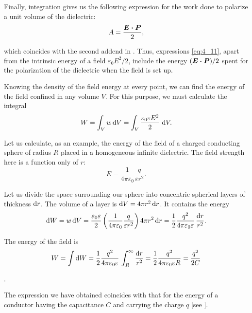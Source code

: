 \noindent
Finally, integration gives us the following expression for the work done to polarize a unit volume of the dielectric:
\begin{equation}\label{eq:4_14}
	A = \frac{\boldsymbol{E\cdot P}}{2},
\end{equation}

\noindent
which coincides with the second addend in . Thus, expressions \eqref{eq:4_11}, apart from the intrinsic energy of a field $\varepsilon_0 E^2/2$, include the energy $(\boldsymbol{E\cdot P})/2$ spent for the polarization of the dielectric when the field is set up.

Knowing the density of the field energy at every point, we can find the energy of the field confined in any volume $V$. For this purpose, we must calculate the integral
\begin{equation}\label{eq:4_15}
	W = \int_V w\, \mathrm{d} V = \int_V \frac{\varepsilon_0 \varepsilon E^2}{2}\ \mathrm{d} V.
\end{equation}

\noindent
Let us calculate, as an example, the energy of the field of a charged conducting sphere of radius $R$ placed in a homogeneous infinite dielectric. The field strength here is a function only of $r$:
\begin{equation*}
	E = \frac{1}{4\pi\varepsilon_0} \frac{q}{\varepsilon r^2}.
\end{equation*}

\noindent
Let us divide the space surrounding our sphere into concentric spherical layers of thickness $\mathrm{d} r$. The volume of a layer is $\mathrm{d} V=4\pi r^2\,\mathrm{d} r$. It contains the energy
\begin{equation*}
	\mathrm{d} W = w\, \mathrm{d} V = \frac{\varepsilon_0 \varepsilon}{2} \left(\frac{1}{4\pi\varepsilon_0} \frac{q}{\varepsilon r^2}\right) 4\pi r^2\,\mathrm{d} r = \frac{1}{2} \frac{q^2}{4\pi \varepsilon_0 \varepsilon}\, \frac{\mathrm{d} r}{r^2}.
\end{equation*}

\noindent
The energy of the field is
\begin{equation*}
	W =  \int \mathrm{d} W = \frac{1}{2} \frac{q^2}{4\pi \varepsilon_0 \varepsilon}\, \int_R^{\infty} \frac{\mathrm{d} r}{r^2} = \frac{1}{2} \frac{q^2}{4\pi \varepsilon_0 \varepsilon R} = \frac{q^2}{2 C}
\end{equation*}

.

The expression we have obtained coincides with that for the energy of a conductor having the capacitance $C$ and carrying the charge $q$ [see ].
